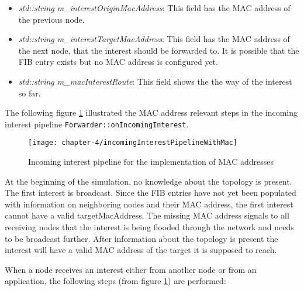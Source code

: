 \begin{itemize}
\item \emph{std::string m\_interestOriginMacAddress}: This field has the MAC address of the previous node.
\item \emph{std::string m\_interestTargetMacAddress}: This field has the MAC address of the next node, that the interest should be forwarded to. It is possible that the FIB entry exists but no MAC address is configured yet.
\item \emph{std::string m\_macInterestRoute}: This field shows the the way of the interest so far.
\end{itemize}

The following figure \ref{fig:incomingInterestPipelineWithMac} illustrated the MAC address relevant steps in the incoming interest pipeline \texttt{Forwarder::onIncomingInterest}.

\begin{figure}[H]
  \centering
  \texttt{[image: chapter-4/incomingInterestPipelineWithMac]}
  \caption{Incoming interest pipeline for the implementation of MAC addresses}
  \label{fig:incomingInterestPipelineWithMac}
\end{figure}

At the beginning of the simulation, no knowledge about the topology is present. The first interest is broadcast. Since the FIB entries have not yet been populated with information on neighboring nodes and their MAC address, the first interest cannot have a valid targetMacAddress. The missing MAC address signals to all receiving nodes that the interest is being flooded through the network and needs to be broadcast further. After information about the topology is present the interest will have a valid MAC address of the target it is supposed to reach.

When a node receives an interest either from another node or from an application, the following steps (from figure \ref{fig:incomingInterestPipelineWithMac}) are performed:

